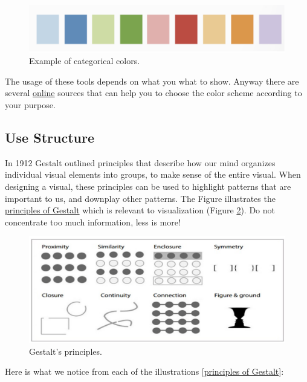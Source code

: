 \begin{figure}[H]%
 \centering
 \includegraphics[width=13cm]{./img/06/categorical}
 \caption{\label{pic:categorical} Example of categorical colors.}
\end{figure}

The usage of these tools depends on what you what to show. Anyway there are several \href{http://colorbrewer2.org/#type=sequential\&scheme=BuGn\&n=3}{online} sources that can help you to choose the color scheme according to your purpose.

\subsection*{Use Structure}

In 1912 Gestalt outlined principles that describe how our mind organizes individual visual elements into groups, to make sense of the entire visual. When designing a visual, these principles can be used to highlight patterns that are important to us, and downplay other patterns. The Figure  illustrates the \href{http://www.fusioncharts.com/blog/2014/03/how-to-use-the-gestalt-principles-for-visual-storytelling-podv/}{principles of Gestalt} which is relevant to visualization (Figure \ref{pic:gestalt}). Do not concentrate too much information, less is more!

\begin{figure}[H]%
 \centering
 \includegraphics[width=13cm]{./img/06/gestalt}
 \caption{\label{pic:gestalt} Gestalt's principles.}
\end{figure}

Here is what we notice from each of the illustrations [\href{http://www.fusioncharts.com/blog/2014/03/how-to-use-the-gestalt-principles-for-visual-storytelling-podv/}{principles of Gestalt}]:


